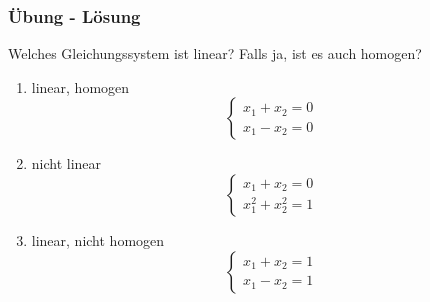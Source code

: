 \begin{frame}
    \frametitle{Übung - Lösung}
    Welches Gleichungssystem ist linear?
    Falls ja, ist es auch homogen?
    \begin{enumerate}
        \item linear, homogen
        \begin{equation*}
            \begin{cases}
                x_1 + x_2 = 0 \\
                x_1 - x_2 = 0
            \end{cases}
        \end{equation*}
        \item nicht linear
        \begin{equation*}
            \begin{cases}
                x_1 + x_2 = 0 \\
                x_1^2 + x_2^2 = 1
            \end{cases}
        \end{equation*}
        \item linear, nicht homogen
        \begin{equation*}
            \begin{cases}
                x_1 + x_2 = 1 \\
                x_1 - x_2 = 1
            \end{cases}
        \end{equation*}
    \end{enumerate}
\end{frame}

